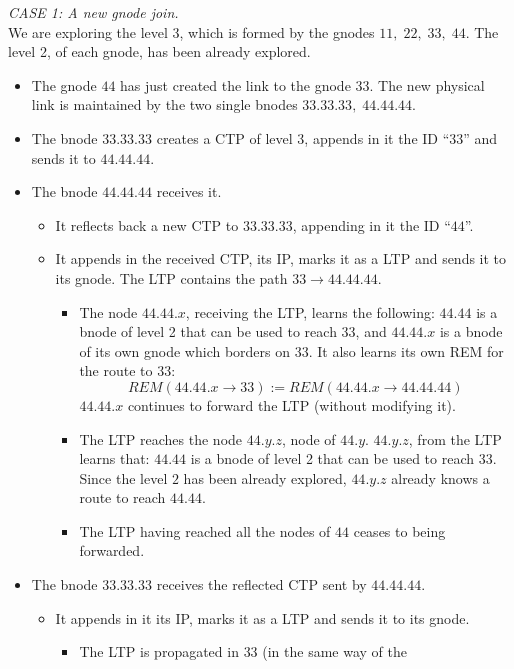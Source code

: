 \documentclass[a4paper]{article}
\begin{document}
\newline
\emph{CASE 1:  A new gnode join.}\\
We are exploring the level 3, which is formed by the gnodes 
$11,\;22,\;33,\;44$. The level 2, of each gnode, has been already
explored.
\begin{itemize}
	\item 
The gnode $44$ has just created the link to the gnode $33$. The
new physical link is maintained by the two single bnodes
$33.33.33,\;44.44.44$.
\item The bnode $33.33.33$ creates a CTP of level 3, appends in it the ID ``$33$''
and sends it to $44.44.44$.
\item The bnode $44.44.44$ receives it.
	\begin{itemize}
		\item It reflects back a new CTP to $33.33.33$, appending in it
			the ID ``$44$''.
		\item It appends in the received CTP, its IP, marks it as a
			LTP and sends it to its gnode. The LTP contains the
			path $33\rightarrow 44.44.44$.
			\begin{itemize}
				\item The node $44.44.x$, receiving the LTP,
					learns the following: $44.44$ is a bnode of
					level 2 that can be used to reach
					$33$, and $44.44.x$ is a bnode of its
					own gnode which borders on $33$. It
					also learns its own REM for the
					route to $33$: \[REM(44.44.x
					\rightarrow
					33):=REM(44.44.x\rightarrow 44.44.44)\]
					$44.44.x$ continues to forward the LTP
					(without modifying it).
				\item The LTP reaches the node $44.y.z$,
					node of $44.y$. $44.y.z$, from the LTP
					learns that: $44.44$ is a bnode of
                                        level 2 that can be used to reach
					$33$. Since the level $2$ has been
					already explored, $44.y.z$ already
					knows a route to reach $44.44$.
				\item The LTP having reached all the nodes of
					$44$ ceases to being forwarded.
			\end{itemize}
	\end{itemize}
\item The bnode $33.33.33$ receives the reflected CTP sent by $44.44.44$.
	\begin{itemize}
		\item It appends in it its IP, marks it as a LTP and sends it to its gnode.
			\begin{itemize}
				\item The LTP is propagated in $33$ (in the same way of the

\end{itemize}
\end{itemize}
\end{itemize}
\end{document}
